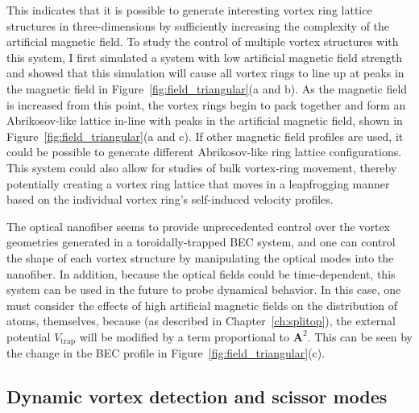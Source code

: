 This indicates that it is possible to generate interesting vortex ring lattice structures in three-dimensions by sufficiently increasing the complexity of the artificial magnetic field.
To study the control of multiple vortex structures with this system, I first simulated a system with low artificial magnetic field strength and showed that this simulation will cause all vortex rings to line up at peaks in the magnetic field in Figure~\ref{fig:field_triangular}(a and b).
As the magnetic field is increased from this point, the vortex rings begin to pack together and form an Abrikosov-like lattice in-line with peaks in the artificial magnetic field, shown in Figure~\ref{fig:field_triangular}(a and c).
If other magnetic field profiles are used, it could be possible to generate different Abrikosov-like ring lattice configurations.
This system could also allow for studies of bulk vortex-ring movement, thereby potentially creating a vortex ring lattice that moves in a leapfrogging manner based on the individual vortex ring's self-induced velocity profiles.

The optical nanofiber seems to provide unprecedented control over the vortex geometries generated in a toroidally-trapped BEC system, and one can control the shape of each vortex structure by manipulating the optical modes into the nanofiber.
In addition, because the optical fields could be time-dependent, this system can be used in the future to probe dynamical behavior.
In this case, one must consider the effects of high artificial magnetic fields on the distribution of atoms, themselves, because (as described in Chapter~\ref{ch:splitop}), the external potential $V_\text{trap}$ will be modified by a term proportional to $\mathbf{A}^2$.
This can be seen by the change in the BEC profile in Figure~\ref{fig:field_triangular}(c).

\subsection{Dynamic vortex detection and scissor modes}

